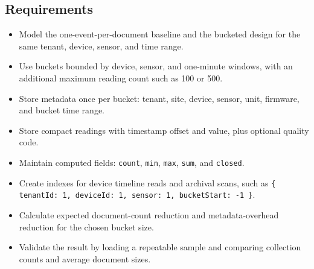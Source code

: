 \subsection*{Requirements}
\begin{itemize}
    \item Model the one-event-per-document baseline and the bucketed design for the same tenant, device, sensor, and time range.
    \item Use buckets bounded by device, sensor, and one-minute windows, with an additional maximum reading count such as 100 or 500.
    \item Store metadata once per bucket: tenant, site, device, sensor, unit, firmware, and bucket time range.
    \item Store compact readings with timestamp offset and value, plus optional quality code.
    \item Maintain computed fields: \texttt{count}, \texttt{min}, \texttt{max}, \texttt{sum}, and \texttt{closed}.
    \item Create indexes for device timeline reads and archival scans, such as \texttt{\{ tenantId: 1, deviceId: 1, sensor: 1, bucketStart: -1 \}}.
    \item Calculate expected document-count reduction and metadata-overhead reduction for the chosen bucket size.
    \item Validate the result by loading a repeatable sample and comparing collection counts and average document sizes.
\end{itemize}

